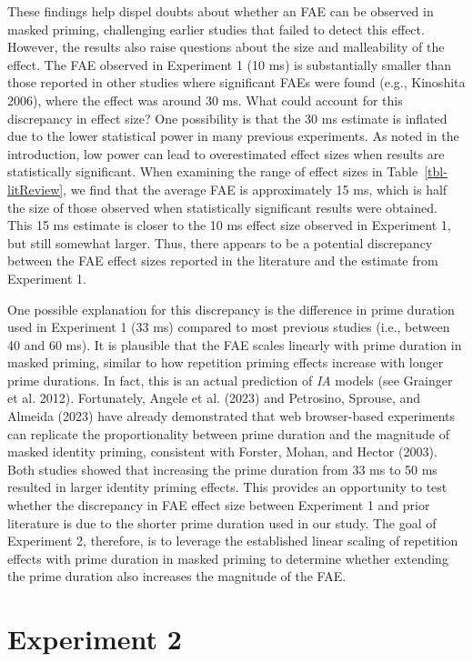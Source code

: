 \documentclass[
]{interact}
\begin{document}
These findings help dispel doubts about whether an FAE can be observed
in masked priming, challenging earlier studies that failed to detect
this effect. However, the results also raise questions about the size
and malleability of the effect. The FAE observed in Experiment 1 (10 ms)
is substantially smaller than those reported in other studies where
significant FAEs were found (e.g., Kinoshita 2006), where the effect was
around 30 ms. What could account for this discrepancy in effect size?
One possibility is that the 30 ms estimate is inflated due to the lower
statistical power in many previous experiments. As noted in the
introduction, low power can lead to overestimated effect sizes when
results are statistically significant. When examining the range of
effect sizes in Table~\ref{tbl-litReview}, we find that the average FAE
is approximately 15 ms, which is half the size of those observed when
statistically significant results were obtained. This 15 ms estimate is
closer to the 10 ms effect size observed in Experiment 1, but still
somewhat larger. Thus, there appears to be a potential discrepancy
between the FAE effect sizes reported in the literature and the estimate
from Experiment 1.

One possible explanation for this discrepancy is the difference in prime
duration used in Experiment 1 (33 ms) compared to most previous studies
(i.e., between 40 and 60 ms). It is plausible that the FAE scales
linearly with prime duration in masked priming, similar to how
repetition priming effects increase with longer prime durations. In
fact, this is an actual prediction of \emph{IA} models (see Grainger et
al. 2012). Fortunately, Angele et al. (2023) and Petrosino, Sprouse, and
Almeida (2023) have already demonstrated that web browser-based
experiments can replicate the proportionality between prime duration and
the magnitude of masked identity priming, consistent with Forster,
Mohan, and Hector (2003). Both studies showed that increasing the prime
duration from 33 ms to 50 ms resulted in larger identity priming
effects. This provides an opportunity to test whether the discrepancy in
FAE effect size between Experiment 1 and prior literature is due to the
shorter prime duration used in our study. The goal of Experiment 2,
therefore, is to leverage the established linear scaling of repetition
effects with prime duration in masked priming to determine whether
extending the prime duration also increases the magnitude of the FAE.

\section{Experiment 2}\label{sec-exp2}
\end{document}
